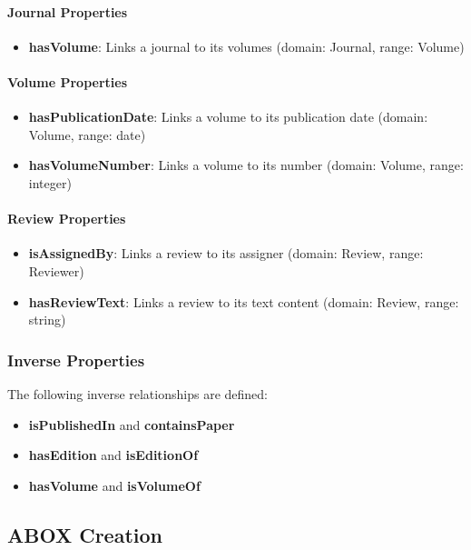\documentclass[10pt,a4paper]{article}
\begin{document}
\paragraph{Journal Properties}
\begin{itemize}
    \item \textbf{hasVolume}: Links a journal to its volumes (domain: Journal, range: Volume)
\end{itemize}

\paragraph{Volume Properties}
\begin{itemize}
    \item \textbf{hasPublicationDate}: Links a volume to its publication date (domain: Volume, range: date)
    \item \textbf{hasVolumeNumber}: Links a volume to its number (domain: Volume, range: integer)
\end{itemize}

\paragraph{Review Properties}
\begin{itemize}
    \item \textbf{isAssignedBy}: Links a review to its assigner (domain: Review, range: Reviewer)
    \item \textbf{hasReviewText}: Links a review to its text content (domain: Review, range: string)
\end{itemize}

\subsubsection{Inverse Properties}
The following inverse relationships are defined:
\begin{itemize}
    \item \textbf{isPublishedIn} and \textbf{containsPaper}
    \item \textbf{hasEdition} and \textbf{isEditionOf}
    \item \textbf{hasVolume} and \textbf{isVolumeOf}
\end{itemize}

\subsection{ABOX Creation}
\label{sec:abox}
\end{document}
